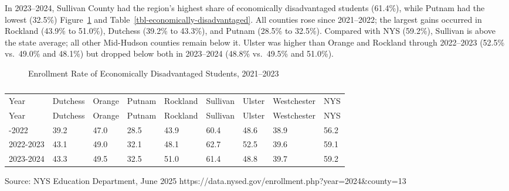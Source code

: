 \documentclass[
  english,
  letterpaper,
]{report}
\begin{document}
In 2023--2024, Sullivan County had the region's highest share of
economically disadvantaged students (61.4\%), while Putnam had the
lowest (32.5\%) Figure~\ref{fig-economically-disadvantaged} and
Table~\ref{tbl-economically-disadvantaged}. All counties rose since
2021--2022; the largest gains occurred in Rockland (43.9\% to 51.0\%),
Dutchess (39.2\% to 43.3\%), and Putnam (28.5\% to 32.5\%). Compared
with NYS (59.2\%), Sullivan is above the state average; all other
Mid-Hudson counties remain below it. Ulster was higher than Orange and
Rockland through 2022--2023 (52.5\% vs.~49.0\% and 48.1\%) but dropped
below both in 2023--2024 (48.8\% vs.~49.5\% and 51.0\%).

\begin{figure}


\caption{\label{fig-economically-disadvantaged}Enrollment Rate of
Economically Disadvantaged Students, 2021--2023}

\end{figure}%

\begin{longtable}[]{@{}lllllllll@{}}

\caption{\label{tbl-economically-disadvantaged}Enrollment Rate of
Economically Disadvantaged Students, 2021--2023}

\tabularnewline

\caption{}\label{T_66b71}\tabularnewline
\toprule\noalign{}
Year & Dutchess & Orange & Putnam & Rockland & Sullivan & Ulster &
Westchester & NYS \\
\midrule\noalign{}
\endfirsthead
\toprule\noalign{}
Year & Dutchess & Orange & Putnam & Rockland & Sullivan & Ulster &
Westchester & NYS \\
\midrule\noalign{}
\endhead
\bottomrule\noalign{}
\endlastfoot
2021-2022 & 39.2 & 47.0 & 28.5 & 43.9 & 60.4 & 48.6 & 38.9 & 56.2 \\
2022-2023 & 43.1 & 49.0 & 32.1 & 48.1 & 62.7 & 52.5 & 39.6 & 59.1 \\
2023-2024 & 43.3 & 49.5 & 32.5 & 51.0 & 61.4 & 48.8 & 39.7 & 59.2 \\

\end{longtable}

\begin{tcolorbox}[enhanced jigsaw, breakable, leftrule=.75mm, title=\textcolor{quarto-callout-note-color}{\faInfo}\hspace{0.5em}{Source}, bottomrule=.15mm, opacityback=0, left=2mm, colback=white, bottomtitle=1mm, coltitle=black, colbacktitle=quarto-callout-note-color!10!white, colframe=quarto-callout-note-color-frame, opacitybacktitle=0.6, toptitle=1mm, titlerule=0mm, arc=.35mm, rightrule=.15mm, toprule=.15mm]

Source: NYS Education Department, June 2025
https://data.nysed.gov/enrollment.php?year=2024\&county=13

\end{tcolorbox}
\end{document}
